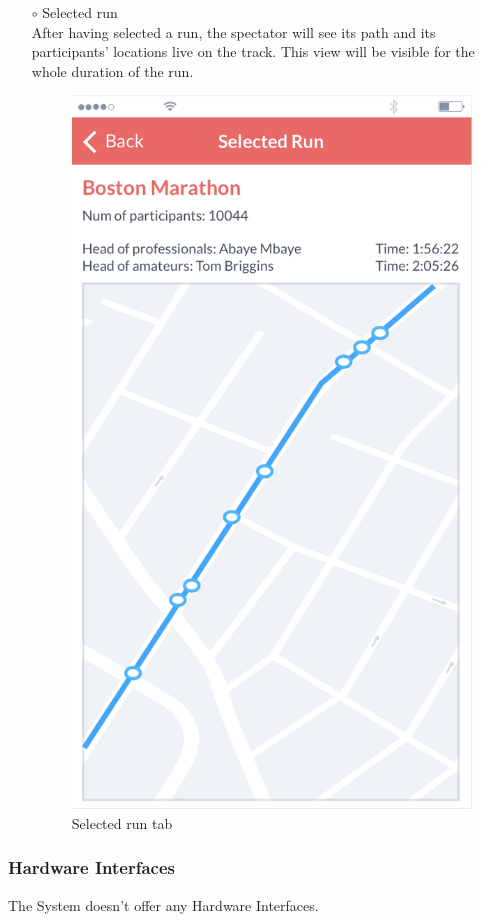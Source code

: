 \documentclass[titlepage]{article}
\begin{document}
\begin{itemize}
\begin{itemize}
\begin{itemize}
					\item[$\circ$] Selected run \\
					After having selected a run, the spectator will see its path and its participants’ locations live on the track. This view will be visible for the whole duration of the run.\\	
					\begin{figure}[H]
						\center
  						\includegraphics[width=0.5\columnwidth]{Mockup/mockupSelectedRun.png}
  						\caption{Selected run tab}
 					 	\label{fig:SelectedRun}
					\end{figure}
				\end{itemize}
			\end{itemize}
		\end{itemize}
						
		\subsubsection{Hardware Interfaces}
		The System doesn’t offer any Hardware Interfaces.
			
\end{document}
